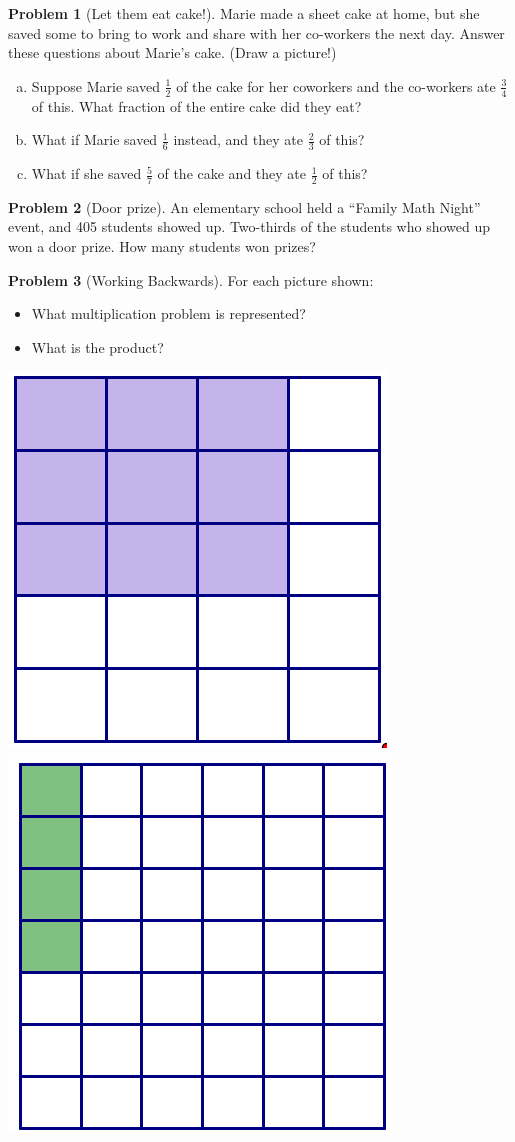 \documentclass[10pt, reqno]{amsart}
\theoremstyle{remark}
\theoremstyle{definition}
\newtheorem{problem}{Problem}
\numberwithin{equation}{section}  %
\begin{document}
\begin{problem}[Let them eat cake!]
Marie made a sheet cake at home, but she saved some to bring to work and share with her co-workers the next day.  Answer these questions about Marie's cake.  (Draw a picture!)
\begin{enumerate}[(a)]
\item
Suppose Marie saved $\frac 1 2$ of the cake for her coworkers and the co-workers ate $\frac 3 4$  of this. What fraction of the entire cake did they eat?\\
\item
    What if Marie saved $\frac 1 6$ instead, and they ate $\frac 2 3$ of this?\\
    \item
    What if she saved $\frac 5 7$ of the cake and they ate $\frac 1 2$ of this?\\
    \end{enumerate}
 
\end{problem}





 \begin{problem}[Door prize]
An elementary school held a ``Family Math Night'' event, and 405 students showed up.  Two-thirds of the students who showed up won a door prize.  How many students won prizes?
\end{problem}


\begin{problem}[Working Backwards]
For each picture shown:
\begin{itemize}
\item
What multiplication problem is represented?
\item
What is the product?
\end{itemize}

\begin{center}
\includegraphics[height=3.5 cm]{FracMult2}
\qquad\qquad\qquad
\includegraphics[height=3.5 cm]{FracMult3}
\end{center}
\end{problem}
\end{document}
